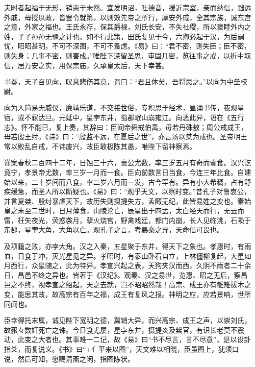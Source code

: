 \documentclass[12pt,UTF8]{ctexbook}
\begin{document}
夫时者起福于无形，销患于未然。宜发明诏，吐德音，援近宗室，亲而纳信，黜远外戚，毋授以政，皆罢令就第，以则效先帝之所行，厚安外戚，全其宗族，诚东宫之意，外家之福也。王氏永存，保其爵禄，刘氏长安，不失社稷，所以褒睦外内之姓，子子孙孙无疆之计也。如不行此策，田氏复见于今，六卿必起于汉，为后嗣忧，昭昭甚明，不可不深图，不可不蚤虑。《易》曰：“君不密，则失臣；臣不密，则失身；几事不密，则害成。”唯陛下深留圣思，审固几密，览往事之戒，以折中取信，居万安之实，用保宗庙，久承皇太后，天下幸甚。



书奏，天子召见向，叹息悲伤其意，谓曰：“君且休矣，吾将思之。”以向为中垒校尉。



向为人简易无威仪，廉靖乐道，不交接世俗，专积思于经术，昼诵书传，夜观星宿，或不寐达旦。元延中，星孛东井，蜀郡岷山崩雍江。向恶此异，语在《五行志》。怀不能已，复上奏，其辞曰：臣闻帝舜戒伯禹，毋若丹硃敖；周公戒成王，毋若殷王纣。《诗》曰：“殷监不远，在夏后之世”，亦言汤以桀为戒也。圣帝明王常以败乱自戒，不讳废兴，故臣敢极陈其愚，唯陛下留神察焉。



谨案春秋二百四十二年，日蚀三十六，襄公尤数，率三岁五月有奇而壹食。汉兴讫竟宁，孝景帝尤数，率三岁一月而一食。臣向前数言日当食，今连三年比食。自建始以来，二十岁间而八食，率二岁六月而一发，古今罕有。异有小大希稠，占有舒疾缓急，而圣人所以断疑也。《易》曰：“观乎天文，以察时变。”昔孔子对鲁哀公，并言夏桀、殷纣暴虐天下，故历失则摄提失方，孟陬无纪，此皆易姓之变也。秦始皇之末至二世时，日月薄食，山陵沦亡，辰星出于四孟，太白经天而行，无云而雷，枉矢夜光，荧惑袭月，孽火烧宫，野禽戏廷，都门内崩，长人见临洮，石陨于东郡，星孛大角，大角以亡。观孔子之言，考暴秦之异，天命信可畏也。



及项籍之败，亦孛大角。汉之入秦，五星聚于东井，得天下之象也。孝惠时，有雨血，日食于冲，灭光星见之异。孝昭时，有泰山卧石自立，上林僵柳复起，大星如月西行，众星随之，此为特异。孝宣兴起之表，天狗夹汉而西，久阴不雨者二十余日，昌邑不终之异也。皆著于《汉纪》。观秦、汉之易世，览惠、昭之无后，察昌邑之不终，视孝宣之绍起，天之去就，岂不昭昭然哉！高宗、成王亦有雊雉拔木之变，能思其故，故高宗有百年之福，成王有复风之报。神明之应，应若景响，世所同闻也。



臣幸得托末属，诚见陛下宽明之德，冀销大异，而兴高宗、成王之声，以崇刘氏，故豤々数奸死亡之诛。今日食尤屡，星孛东井，摄提炎及紫官，有识长老莫不震动，此变之大者也。其事难一二记，故《易》曰“书不尽言，言不尽意”，是以设卦指爻，而复说义。《书》曰“+亻平来以图”，天文难以相晓，臣虽图上，犹须口说，然后可知，愿赐清燕之闲，指图陈状。
\end{document}
